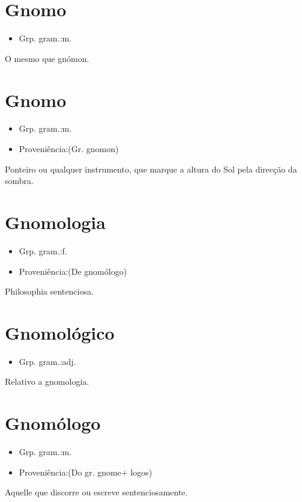 \section{Gnomo}
\begin{itemize}
\item {Grp. gram.:m.}
\end{itemize}
O mesmo que \textunderscore gnómon\textunderscore .
\section{Gnomo}
\begin{itemize}
\item {Grp. gram.:m.}
\end{itemize}
\begin{itemize}
\item {Proveniência:(Gr. \textunderscore gnomon\textunderscore )}
\end{itemize}
Ponteiro ou qualquer instrumento, que marque a altura do Sol pela direcção da sombra.
\section{Gnomologia}
\begin{itemize}
\item {Grp. gram.:f.}
\end{itemize}
\begin{itemize}
\item {Proveniência:(De \textunderscore gnomólogo\textunderscore )}
\end{itemize}
Philosophia sentenciosa.
\section{Gnomológico}
\begin{itemize}
\item {Grp. gram.:adj.}
\end{itemize}
Relativo a gnomologia.
\section{Gnomólogo}
\begin{itemize}
\item {Grp. gram.:m.}
\end{itemize}
\begin{itemize}
\item {Proveniência:(Do gr. \textunderscore gnome\textunderscore  + \textunderscore logos\textunderscore )}
\end{itemize}
Aquelle que discorre ou escreve sentenciosamente.
